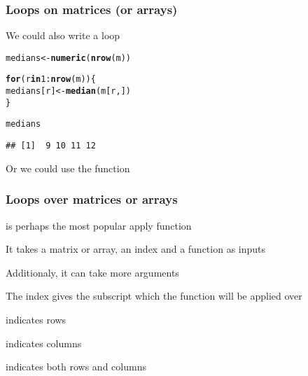 \documentclass[12pt]{beamer}\usepackage[]{graphicx}\usepackage[]{color}
\makeatletter
\newcommand{\hlnum}[1]{\textcolor[rgb]{0.686,0.059,0.569}{#1}}%
\newcommand{\hlopt}[1]{\textcolor[rgb]{0,0,0}{#1}}%
\newcommand{\hlstd}[1]{\textcolor[rgb]{0.345,0.345,0.345}{#1}}%
\newcommand{\hlkwa}[1]{\textcolor[rgb]{0.161,0.373,0.58}{\textbf{#1}}}%
\newcommand{\hlkwb}[1]{\textcolor[rgb]{0.69,0.353,0.396}{#1}}%
\newcommand{\hlkwd}[1]{\textcolor[rgb]{0.737,0.353,0.396}{\textbf{#1}}}%
\newenvironment{kframe}{%
 \def\at@end@of@kframe{}%
 \ifinner\ifhmode%
  \def\at@end@of@kframe{\end{minipage}}%
  \begin{minipage}{\columnwidth}%
 \fi\fi%
 \def\FrameCommand##1{\hskip\@totalleftmargin \hskip-\fboxsep
 \colorbox{shadecolor}{##1}\hskip-\fboxsep
     \hskip-\linewidth \hskip-\@totalleftmargin \hskip\columnwidth}%
 \MakeFramed {\advance\hsize-\width
   \@totalleftmargin\z@ \linewidth\hsize
   \@setminipage}}%
 {\par\unskip\endMakeFramed%
 \at@end@of@kframe}
\newenvironment{knitrout}{}{} %
\makeatother
\begin{document}

\begin{frame}[fragile]
\frametitle{Loops on matrices (or arrays)}

We could also write a  loop
\begin{knitrout}\footnotesize
{}\color{fgcolor}\begin{kframe}
\begin{alltt}
\hlstd{medians} \hlkwb{<-} \hlkwd{numeric}\hlstd{(}\hlkwd{nrow}\hlstd{(m))}

\hlkwa{for} \hlstd{(r} \hlkwa{in} \hlnum{1}\hlopt{:}\hlkwd{nrow}\hlstd{(m)) \{}
  \hlstd{medians[r]} \hlkwb{<-} \hlkwd{median}\hlstd{(m[r, ])}
\hlstd{\}}

\hlstd{medians}
\end{alltt}
\begin{verbatim}
## [1]  9 10 11 12
\end{verbatim}
\end{kframe}
\end{knitrout}

Or we could use the {\hilit {}} function

\end{frame}


\begin{frame}
\frametitle{Loops over matrices or arrays}

\bbi
  \item {\hilit {}} is perhaps the most popular apply function
  \item It takes a matrix or array, an index and a function as inputs
  \item Additionaly, it can take more arguments
  \item The  index gives the subscript which the function will be applied over
  \bi
    \item {} indicates rows
    \item {} indicates columns
    \item {} indicates both rows and columns
  \ei
\ei

\end{frame}

\end{document}
